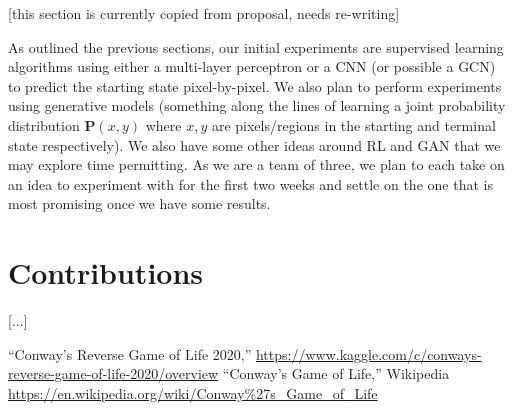 \documentclass[conference]{IEEEtran}
\begin{document}
[this section is currently copied from proposal, needs re-writing]

As outlined the previous sections, our initial experiments are supervised learning algorithms using either a multi-layer perceptron or a CNN (or possible a GCN) to predict the starting state pixel-by-pixel. We also plan to perform experiments using generative models (something along the lines of learning a joint probability distribution $\mathbf P(x, y)$ where $x, y$ are pixels/regions in the starting and terminal state respectively). We also have some other ideas around RL and GAN that we may explore time permitting. As we are a team of three, we plan to each take on an idea to experiment with for the first two weeks and settle on the one that is most promising once we have some results.

\section{Contributions}
[...]

\begin{thebibliography}{00}
 ``Conway's Reverse Game of Life 2020,'' \url{https://www.kaggle.com/c/conways-reverse-game-of-life-2020/overview}
 ``Conway's Game of Life,'' Wikipedia \url{https://en.wikipedia.org/wiki/Conway\%27s_Game_of_Life}
\end{thebibliography}
\end{document}
